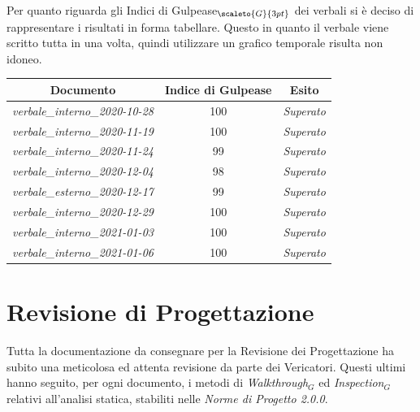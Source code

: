{Per quanto riguarda gli Indici di Gulpease$_{\scaleto{G}{3pt}}$ dei verbali si è deciso di rappresentare i risultati in forma tabellare.
Questo in quanto il verbale viene scritto tutta in una volta, quindi utilizzare un grafico temporale risulta non idoneo.
\quad
\def\tabularxcolumn#1{m{#1}}
{
	\begin{center}
		\renewcommand{\arraystretch}{1.4}
		\begin{tabularx}{11.65cm}{|c|c|c|}
			\hline
			\rowcolor{airforceblue}
			\textbf{Documento} & \textbf{Indice di Gulpease} & \textbf{Esito}\\
			\hline
			\textit{verbale\_interno\_2020-10-28} & 100  & \textit{Superato}\\
			\hline
			\textit{verbale\_interno\_2020-11-19} & 100 & \textit{Superato}\\
			\hline
			\textit{verbale\_interno\_2020-11-24} & 99 & \textit{Superato}\\
			\hline
			\textit{verbale\_interno\_2020-12-04} & 98 & \textit{Superato}\\
			\hline
			\textit{verbale\_esterno\_2020-12-17} & 99 & \textit{Superato}\\
			\hline
			\textit{verbale\_interno\_2020-12-29} & 100 & \textit{Superato}\\
			\hline
			\textit{verbale\_interno\_2021-01-03} & 100 & \textit{Superato}\\
			\hline
			\textit{verbale\_interno\_2021-01-06} & 100 & \textit{Superato}\\
			\hline
		\end{tabularx}
	\end{center}

\section{Revisione di Progettazione} \label{ResocontoAttivitàDiVerificaRevisioneDiProgettazione}
Tutta la documentazione da consegnare per la Revisione dei Progettazione ha subito una meticolosa ed attenta revisione da parte dei Vericatori. Questi ultimi
hanno seguito, per ogni documento, i metodi di \textit{Walkthrough$_G$} ed \textit{Inspection$_G$} relativi all'analisi statica, stabiliti nelle \textit{Norme di Progetto 2.0.0}.

}}

